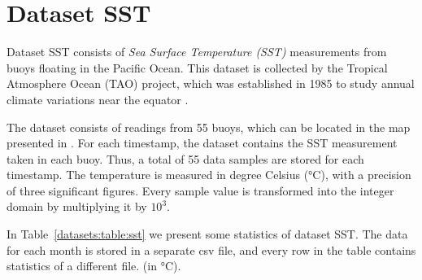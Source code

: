 

\vspace{-10pt}
\section{Dataset SST}
\label{datasets:sst}
\newcommand{\TAODef}{This dataset is collected by the Tropical Atmosphere Ocean (TAO) project, which was established in 1985 to study annual climate variations near the equator \cite{dataset:tao}.}

Dataset SST \cite{dataset:sst1} consists of \textit{Sea Surface Temperature (SST)} measurements from buoys floating in the Pacific Ocean. \TAODef


The dataset consists of readings from 55 buoys, which can be located in the map presented in \cite{dataset:sst1}. For each timestamp, the dataset contains the SST measurement taken in each buoy. Thus, a total of 55 data samples are stored for each timestamp. The temperature is measured in degree Celsius (°C), with a precision of three significant figures. Every sample value is transformed into the integer domain by multiplying it by $10^3$.


\clearpage


In Table~\ref{datasets:table:sst} we present some statistics of dataset SST. The data for each month is stored in a separate csv file, and every row in the table contains statistics of a different file. \commonTable (in °C).




